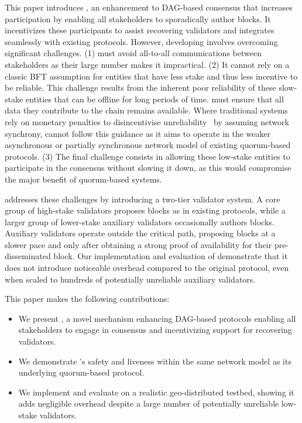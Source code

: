 This paper introduces \sysname, an enhancement to DAG-based consensus that increases participation by enabling all stakeholders to sporadically author blocks. It incentivizes these participants to assist recovering validators and integrates seamlessly with existing protocols. However, developing \sysname involves overcoming significant challenges.
(1) \sysname must avoid all-to-all communications between stakeholders as their large number makes it impractical.
(2) It cannot rely on a classic BFT assumption for entities that have less stake and thus less incentive to be reliable. This challenge results from the inherent poor reliability of these slow-stake entities that can be offline for long periods of time. \sysname must ensure that all data they contribute to the chain remains available. Where traditional systems rely on monetary penalties to disincentivise unreliability~\cite{he2023don} by assuming network synchrony, \sysname cannot follow this guidance as it aims to operate in the weaker asynchronous or partially synchronous network model of existing quorum-based protocols.
(3) The final challenge consists in allowing these low-stake entities to participate in the consensus without slowing it down, as this would compromise the major benefit of quorum-based systems.

\sysname addresses these challenges by introducing a two-tier validator system. A core group of high-stake validators proposes blocks as in existing protocols, while a larger group of lower-stake auxiliary validators occasionally authors blocks. Auxiliary validators operate outside the critical path, proposing blocks at a slower pace and only after obtaining a strong proof of availability for their pre-disseminated block. Our implementation and evaluation of \sysname demonstrate that it does not introduce noticeable overhead compared to the original protocol, even when scaled to hundreds of potentially unreliable auxiliary validators.

This paper makes the following contributions:
\begin{itemize}
    \item We present \sysname, a novel mechanism enhancing DAG-based protocols enabling all stakeholders to engage in consensus and incentivizing support for recovering validators.
    \item We demonstrate \sysname's safety and liveness within the same network model as its underlying quorum-based protocol.
    \item We implement and evaluate \sysname on a realistic geo-distributed testbed, showing it adds negligible overhead despite a large number of potentially unreliable low-stake validators.
\end{itemize}
